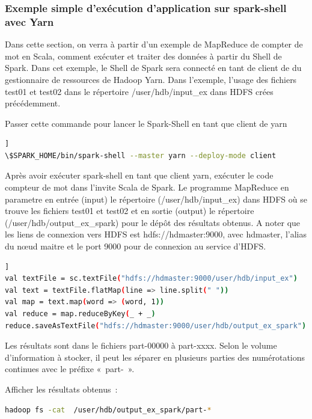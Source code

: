 \documentclass[12pt,english]{book}
\begin{document}
\subsubsection{Exemple simple d’exécution d’application sur spark-shell avec Yarn}

Dans cette section, on verra à partir d’un exemple de MapReduce de compter de mot en Scala, comment exécuter et traiter des données à partir du Shell de Spark.
Dans cet exemple, le Shell de Spark sera connecté en tant de client de du gestionnaire de ressources de Hadoop Yarn.
Dans l’exemple, l’usage des fichiers test01 et test02 dans le répertoire /user/hdb/input\_ex dans HDFS crées précédemment.

Passer cette commande pour lancer le Spark-Shell en tant que client de yarn

\begin{lstlisting}[language=bash, frame=single, breaklines=true, postbreak=\mbox{\textcolor{red}{$\hookrightarrow$}\space}]]
\$SPARK_HOME/bin/spark-shell --master yarn --deploy-mode client
\end{lstlisting}

Après avoir exécuter spark-shell en tant que client yarn, exécuter le code compteur de mot dans l’invite Scala de Spark.
Le programme MapReduce en parametre en entrée (input) le répertoire (/user/hdb/input\_ex) dans HDFS où se trouve les fichiers test01 et test02 et en sortie (output) le répertoire (/user/hdb/output\_ex\_spark) pour le dépôt des résultats obtenus.
A noter que les liens de connexion vers HDFS est hdfs://hdmaster:9000, avec hdmaster, l’alias du nœud maitre et le port 9000 pour de connexion au service d’HDFS.

\begin{lstlisting}[language=bash, frame=single, breaklines=true, postbreak=\mbox{\textcolor{red}{$\hookrightarrow$}\space}]]
val textFile = sc.textFile("hdfs://hdmaster:9000/user/hdb/input_ex")
val text = textFile.flatMap(line => line.split(" "))
val map = text.map(word => (word, 1))
val reduce = map.reduceByKey(_ + _)
reduce.saveAsTextFile("hdfs://hdmaster:9000/user/hdb/output_ex_spark")
\end{lstlisting}

Les résultats sont dans le fichiers part-00000 à part-xxxx.
Selon le volume d’information à stocker, il peut les séparer en plusieurs parties des numérotations continues avec le préfixe « part- ».

Afficher les résultats obtenus :

\begin{lstlisting}[language=bash, frame=single]
hadoop fs -cat  /user/hdb/output_ex_spark/part-*
\end{lstlisting}
\end{document}
